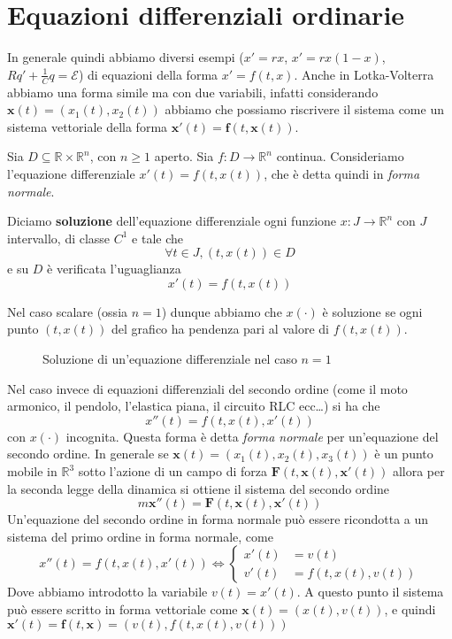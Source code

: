 \section{Equazioni differenziali ordinarie}
In generale quindi abbiamo diversi esempi (\(x' = rx\), \(x' = rx(1-x)\), \(Rq'
+ \frac{1}{C} q = \mathcal{E}\)) di equazioni della forma \(x' = f(t, x)\).
Anche in Lotka-Volterra abbiamo una forma simile ma con due variabili, infatti
considerando \(\mathbf{x}(t) = (x_{1}(t), x_{2}(t))\) abbiamo che possiamo
riscrivere il sistema come un sistema vettoriale della forma \(\mathbf{x}'(t) =
\mathbf{f}(t, \mathbf{x}(t))\).
\begin{definition}
    Sia \(D \subseteq \mathbb{R} \times \mathbb{R}^{n} \), con \(n \ge 1\)
    aperto. Sia \(f : D \to \mathbb{R}^{n}\) continua. Consideriamo l'equazione
    differenziale \(x'(t) = f(t, x(t))\), che è detta quindi in \emph{forma
    normale}.

    Diciamo \textbf{soluzione} dell'equazione differenziale ogni funzione \(x :
    J \to \mathbb{R}^{n}\) con \(J\) intervallo, di classe \(C^{1}\) e tale che 
    \[
        \forall t \in J, (t, x(t)) \in D
    \]
    e su \(D\) è verificata l'uguaglianza 
    \[
        x'(t) = f(t, x(t))
    \]
\end{definition}
Nel caso scalare (ossia \(n=1\)) dunque abbiamo che \(x(\cdot )\) è soluzione se ogni punto
\((t, x(t))\) del grafico ha pendenza pari al valore di \(f(t, x(t))\).
\begin{figure}[ht]
    \centering
    \caption{Soluzione di un'equazione differenziale nel caso \(n=1\) }\label{fig:pendenzagrafico}
\end{figure}

Nel caso invece di equazioni differenziali del secondo ordine (come il moto
armonico, il pendolo, l'elastica piana, il circuito RLC ecc\dots) si ha che 
\[
    x''(t) = f(t, x(t), x'(t))
\]
con \(x(\cdot )\) incognita. Questa forma è detta \emph{forma normale} per
un'equazione del secondo ordine.
In generale se \(\mathbf{x}(t) = (x_{1}(t), x_{2}(t), x_{3}(t)) \) è un punto
mobile in \(\mathbb{R}^{3}\) sotto l'azione di un campo di forza \(\mathbf{F}(t,
\mathbf{x}(t), \mathbf{x}'(t))\) allora per la seconda legge della dinamica si
ottiene il sistema del secondo ordine
\[
    m\mathbf{x}''(t) = \mathbf{F}(t, \mathbf{x}(t), \mathbf{x}'(t)) 
\]
Un'equazione del secondo ordine in forma normale può essere ricondotta a un
sistema del primo ordine in forma normale, come
\[
    x''(t) = f(t, x(t), x'(t)) \iff
    \begin{cases}
        x'(t) &= v(t) \\
        v'(t) &= f(t, x(t), v(t))
    \end{cases}
\]
Dove abbiamo introdotto la variabile \(v(t) = x'(t)\). A questo punto il sistema
può essere scritto in forma vettoriale come \(\mathbf{x}(t) = (x(t), v(t))\), e
quindi \(\mathbf{x}'(t) = \mathbf{f}(t, \mathbf{x}) = (v(t), f(t, x(t), v(t)))\) 

